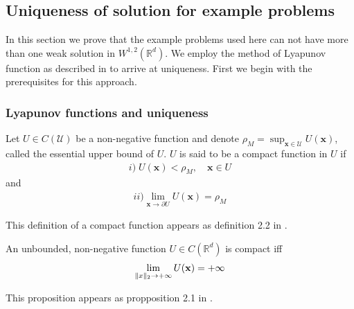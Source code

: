 \subsection{Uniqueness of solution for example problems}\label{ssec-unique} In this section we prove that the example problems used here can not have more than one weak solution in $W^{1,2}(\mathbb R^d)$.
 We employ the method of Lyapunov function as described in \cite{huang2015steady} to arrive at uniqueness. First we begin with the prerequisites for this approach.
 \subsubsection{Lyapunov functions and uniqueness}
\begin{defn}
    Let $U \in C(\mathcal U)$ be a non-negative function and denote $\rho_M = \sup_{\mathbf x\in \mathcal U} U(\mathbf x)$,
called the essential upper bound of $U$. $U$ is said to be a compact function in $U$ if
\begin{align}
i)\; U (\mathbf x) < \rho_M,\quad \mathbf x \in U
\end{align}
and
\begin{align}
ii) \lim_{\mathbf x\to\partial U} U (\mathbf x) = \rho_M 
\end{align}
\end{defn} This definition of a compact function appears as definition 2.2 in \cite{huang2015steady}.
\begin{prop}
An unbounded, non-negative function $U\in C(\mathbb R^d)$ is compact iff 
\begin{align}
    \lim_{\|\mathbf \mathbf x\|_2\to+\infty} U(\mathbf x) = +\infty
\end{align}
\end{prop}
This proposition appears as propposition 2.1 in \cite{huang2015steady}.

